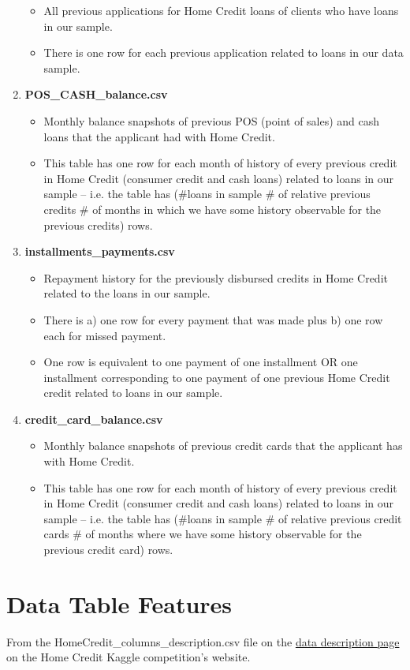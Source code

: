 \documentclass[12pt, letterpaper]{article}
\begin{document}
\begin{appendices}
\begin{enumerate}
\begin{itemize}
      \item All previous applications for Home Credit loans of clients who have loans in our sample.
      \item There is one row for each previous application related to loans in our data sample.
    \end{itemize}
  \item \textbf{POS_CASH_balance.csv}
    \begin{itemize}
      \item Monthly balance snapshots of previous POS (point of sales) and cash loans that the applicant had with Home Credit.
      \item This table has one row for each month of history of every previous credit in Home Credit (consumer credit and cash loans) related to loans in our sample – i.e. the table has (\#loans in sample \# of relative previous credits \# of months in which we have some history observable for the previous credits) rows.
    \end{itemize}
  \item \textbf{installments_payments.csv}
    \begin{itemize}
      \item Repayment history for the previously disbursed credits in Home Credit related to the loans in our sample.
      \item There is a) one row for every payment that was made plus b) one row each for missed payment.
      \item One row is equivalent to one payment of one installment OR one installment corresponding to one payment of one previous Home Credit credit related to loans in our sample.
    \end{itemize}
  \item \textbf{credit_card_balance.csv}
    \begin{itemize}
      \item Monthly balance snapshots of previous credit cards that the applicant has with Home Credit.
      \item This table has one row for each month of history of every previous credit in Home Credit (consumer credit and cash loans) related to loans in our sample – i.e. the table has (\#loans in sample \# of relative previous credit cards \# of months where we have some history observable for the previous credit card) rows.
    \end{itemize}
\end{enumerate}

\section{Data Table Features}
\label{appendix:datatablefeatures}
From the HomeCredit_columns_description.csv file on the \href{https://www.kaggle.com/c/home-credit-default-risk/data}{data description page} on the Home Credit Kaggle competition's website\cite{kagglehomecreditcompetitiondata}.

\end{appendices}
\end{document}
